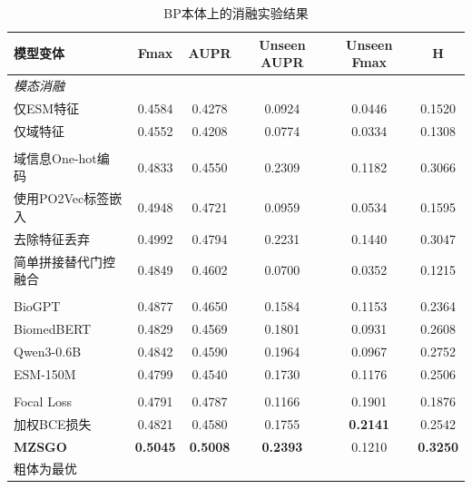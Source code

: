 \begin{table}[htbp]
    \centering
    \caption{BP本体上的消融实验结果}
    \label{tab:mzsgo_ablation_bp}
    \small
    \begin{tabular}{lccccc}
        \toprule
        \textbf{模型变体} & \textbf{Fmax} & \textbf{AUPR} & \textbf{Unseen AUPR} & \textbf{Unseen Fmax} & \textbf{H} \\
        \midrule
        \multicolumn{6}{l}{\textit{模态消融}} \\
        仅ESM特征 & 0.4584 & 0.4278 & 0.0924 & 0.0446 & 0.1520 \\
        仅域特征 & 0.4552 & 0.4208 & 0.0774 & 0.0334 & 0.1308 \\
        \addlinespace[5pt]
        \multicolumn{6}{l}{\textit{特征与架构消融}} \\
        域信息One-hot编码 & 0.4833 & 0.4550 & 0.2309 & 0.1182 & 0.3066 \\
        使用PO2Vec标签嵌入 & 0.4948 & 0.4721 & 0.0959 & 0.0534 & 0.1595 \\
        去除特征丢弃 & 0.4992 & 0.4794 & 0.2231 & 0.1440 & 0.3047 \\
        简单拼接替代门控融合 & 0.4849 & 0.4602 & 0.0700 & 0.0352 & 0.1215 \\
        \addlinespace[5pt]
        \multicolumn{6}{l}{\textit{编码器变体}} \\
        BioGPT & 0.4877 & 0.4650 & 0.1584 & 0.1153 & 0.2364 \\
        BiomedBERT & 0.4829 & 0.4569 & 0.1801 & 0.0931 & 0.2608 \\
        Qwen3-0.6B & 0.4842 & 0.4590 & 0.1964 & 0.0967 & 0.2752 \\
        ESM-150M & 0.4799 & 0.4540 & 0.1730 & 0.1176 & 0.2506 \\
        \addlinespace[5pt]
        \multicolumn{6}{l}{\textit{损失函数变体}} \\
        Focal Loss & 0.4791 & 0.4787 & 0.1166 & 0.1901 & 0.1876 \\
        加权BCE损失 & 0.4821 & 0.4580 & 0.1755 & \textbf{0.2141} & 0.2542 \\
        \addlinespace[5pt]
        \textbf{MZSGO} & \textbf{0.5045} & \textbf{0.5008} & \textbf{0.2393} & 0.1210 & \textbf{0.3250} \\
        \bottomrule
\multicolumn{6}{l}{\vspace{0.2em}\footnotesize 粗体为最优} \\
    \end{tabular}
\end{table}

